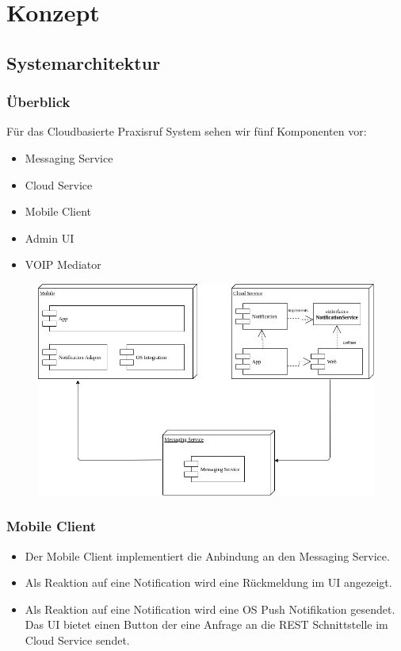 \section{Konzept}\label{sec:konzept}
\subsection{Systemarchitektur}\label{subsec:systemarchitektur}
\subsubsection*{Überblick}

Für das Cloudbasierte Praxisruf System sehen wir fünf Komponenten vor:

\begin{itemize}
    \item Messaging Service
    \item Cloud Service
    \item Mobile Client
    \item Admin UI
    \item VOIP Mediator
\end{itemize}


\begin{figure}
    \centering
    \includegraphics[width=\linewidth]{graphics/IP5_POC_Cloud_Architecture}\label{fig:architecure}
\end{figure}


\subsubsection*{Mobile Client}

\begin{itemize}
    \item Der Mobile Client implementiert die Anbindung an den Messaging Service.
    \item Als Reaktion auf eine Notification wird eine Rückmeldung im UI angezeigt.
    \item Als Reaktion auf eine Notification wird eine OS Push Notifikation gesendet.
    Das UI bietet einen Button der eine Anfrage an die REST Schnittstelle im Cloud Service sendet.
\end{itemize}


